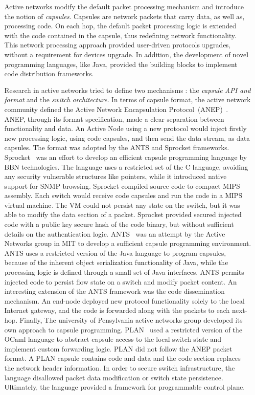 Active networks modify the default packet processing mechanism and introduce the
notion of \emph{capsules}. Capsules are network packets that carry data, as
well as, processing code. On each hop, the default packet processing logic is
extended with the code contained in the capsule, thus redefining network
functionality. This network processing approach provided user-driven protocols
upgrades, without a requirement for devices upgrade.  In addition, the
development of novel programming languages, like Java, provided the
building blocks to implement code distribution frameworks.

Research in active networks tried to define two mechanisms : the \emph{capsule
  API and format} and the \emph{switch architecture}. In terms of capsule
format, the active network community defined the Active Network Encapsulation
Protocol~(ANEP)~\cite{alexander1997a}.  ANEP, through its format specification,
made a clear separation between functionality and data. An Active Node using a
new protocol would inject firstly new processing logic, using code capsules, and
then send the data stream, as data capsules.  The format was adopted by the ANTS
and Sprocket frameworks.  Sprocket~\cite{Schwartz2000} was an effort to develop
an efficient capsule programming language by BBN technologies. The language uses
a restricted set of the C language, avoiding any security vulnerable structures
like pointers, while it introduced native support for SNMP browsing. Sprocket
compiled source code to compact MIPS assembly. Each switch would receive code
capsules and run the code in a MIPS virtual machine. The VM could not persist
any state on the switch, but it was able to modify the data section of a packet.
Sprocket provided secured injected code with a public key secure hash of the
code binary, but without sufficient details on the authentication logic.
ANTS~\cite{Wetherall1998} was an attempt by the Active Networks group in MIT to
develop a sufficient capsule programming environment.  ANTS uses a restricted
version of the Java language to program capsules, because of the inherent object
serialization functionality of Java, while the processing logic is defined
through a small set of Java interfaces. ANTS permits injected code to persist
flow state on a switch and modify packet content. An interesting extension of
the ANTS framework was the code dissemination mechanism. An end-node deployed
new protocol functionality solely to the local Internet gateway, and the code is
forwarded along with the packets to each next-hop. Finally, The university of
Pensylvania active networks group developed its own approach to capsule
programming.  PLAN~\cite{Hicks1998} used a restricted version of the OCaml
language to abstract capsule access to the local switch state and implement
custom forwarding logic. PLAN did not follow the ANEP packet format. A PLAN
capsule contains code and data and the code section replaces the network header
information. In order to secure switch infrastructure, the language disallowed
packet data modification or switch state persistence.  Ultimately, the language
provided a framework for programmable control plane.

